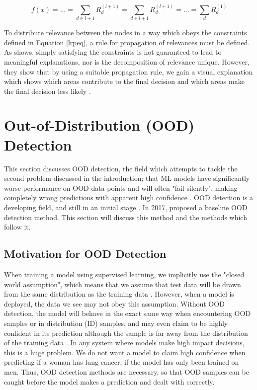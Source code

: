 \documentclass[conference]{IEEEtran}
\begin{document}
\begin{equation}
f(x) = ... = \sum_{d \in l + 1} R^{(l + 1)}_d = \sum_{d \in l + 1} R^{(l + 1)}_d = ... = \sum_d R^{(1)}_d
\label{lrpeq}
\end{equation}

To distribute relevance between the nodes in a way which obeys the constraints defined in Equation \ref{lrpeq}, a rule for propagation of relevances must be defined. As \cite{lrp} shows, simply satisfying the constraints is not guaranteed to lead to meaningful explanations, nor is the decomposition of relevance unique. However, they show that by using a suitable propagation rule, we gain a visual explanation which shows which areas contribute to the final decision and which areas make the final decision less likely \cite[28]{lrp}.

\section{Out-of-Distribution (OOD) Detection} \label{ood_intro}

This section discusses OOD detection, the field which attempts to tackle the second problem discussed in the introduction; that ML models have significantly worse performance on OOD data points and will often "fail silently", making completely wrong predictions with apparent high confidence \cite{adversarial}. OOD detection is a developing field, and still in an initial stage \cite{ooddl}. In 2017, \cite{oodbaseline} proposed a baseline OOD detection method. This section will discuss this method and the methods which follow it.

\subsection{Motivation for OOD Detection}

When training a model using supervised learning, we implicitly use the "closed world assumption", which means that we assume that test data will be drawn from the same distribution as the training data \cite{oodoverview}. However, when a model is deployed, the data we see may not obey this assumption. Without OOD detection, the model will behave in the exact same way when encountering OOD samples or in distribution (ID) samples, and may even claim to be highly confident in its prediction although the sample is far away from the distribution of the training data \cite[1]{energy}. In any system where models make high impact decisions, this is a huge problem. We do not want a model to claim high confidence when predicting if a woman has lung cancer, if the model has only been trained on men. Thus, OOD detection methods are necessary, so that OOD samples can be caught before the model makes a prediction and dealt with correctly.
\end{document}
